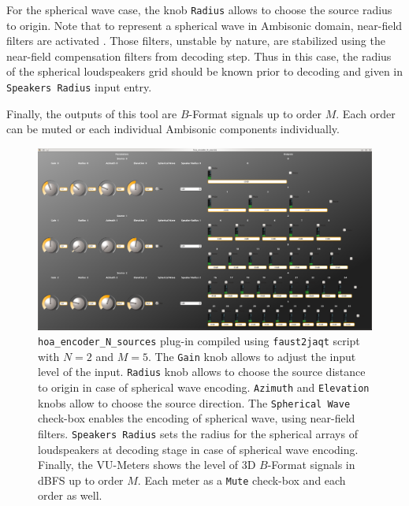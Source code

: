 \documentclass[10pt,a4paper]{article}
\begin{document}
For the spherical wave case, the knob \lstinline'Radius' allows to choose the source radius to origin. Note that to represent a spherical wave in Ambisonic domain, near-field filters are activated \cite{daniel2003spatial,lecomte2015real}. Those filters, unstable by nature, are stabilized using the near-field compensation filters from decoding step. Thus in this case, the radius of the spherical loudspeakers grid should be known prior to decoding and given in \lstinline'Speakers Radius' input entry.

Finally, the outputs of this tool are $B$-Format signals up to order $M$. Each order can be muted or each individual Ambisonic components individually.

\begin{figure}[!ht]
\includegraphics[width=\columnwidth]{hoa_encoder.png}
\caption{\lstinline'hoa_encoder_N_sources' plug-in compiled using \lstinline'faust2jaqt' script with $N=2$ and $M=5$. The \lstinline'Gain' knob allows to adjust the input level of the input. \lstinline'Radius' knob allows to choose the source distance to origin in case of spherical wave encoding. \lstinline'Azimuth' and \lstinline'Elevation' knobs allow to choose the source direction. The \lstinline'Spherical Wave' check-box enables the encoding of spherical wave, using near-field filters. \lstinline'Speakers Radius' sets the radius for the spherical arrays of loudspeakers at decoding stage in case of spherical wave encoding. Finally, the VU-Meters shows the level of 3D $B$-Format signals in dBFS up to order $M$. Each meter as a \lstinline'Mute' check-box and each order as well.}
\label{fig:hoa_encoder}
\end{figure}
\pagebreak
\end{document}
